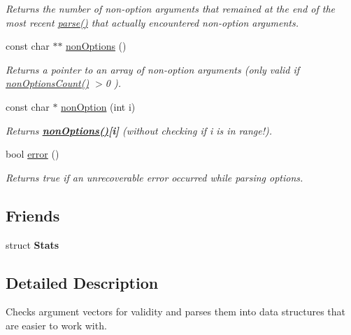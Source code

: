 \begin{DoxyCompactItemize}
\begin{DoxyCompactList}\small\item\em Returns the number of non-\/option arguments that remained at the end of the most recent \hyperlink{classoption_1_1Parser_a6e0b5778d1cfbd6cd51240e74d01e138}{parse()} that actually encountered non-\/option arguments. \end{DoxyCompactList}\item 
const char $\ast$$\ast$ \hyperlink{classoption_1_1Parser_a2c11b050f4248d71758dda52c5f9154d}{non\+Options} ()
\begin{DoxyCompactList}\small\item\em Returns a pointer to an array of non-\/option arguments (only valid if {\ttfamily \hyperlink{classoption_1_1Parser_aa64a6a7c196993a1b20d48e8ddd12a34}{non\+Options\+Count()} $>$0 }). \end{DoxyCompactList}\item 
\mbox{\label{classoption_1_1Parser_aeeafbf2892a5aca90b89803b2b1cb031}} 
const char $\ast$ \hyperlink{classoption_1_1Parser_aeeafbf2892a5aca90b89803b2b1cb031}{non\+Option} (int i)
\begin{DoxyCompactList}\small\item\em Returns {\bfseries {\ttfamily \hyperlink{classoption_1_1Parser_a2c11b050f4248d71758dda52c5f9154d}{non\+Options()}\mbox{[}i\mbox{]}}} ({\itshape without} checking if i is in range!). \end{DoxyCompactList}\item 
bool \hyperlink{classoption_1_1Parser_a2caa149140067b4d13e4d7a104bb3090}{error} ()
\begin{DoxyCompactList}\small\item\em Returns {\ttfamily true} if an unrecoverable error occurred while parsing options. \end{DoxyCompactList}\end{DoxyCompactItemize}
\subsection*{Friends}
\begin{DoxyCompactItemize}
\item 
\mbox{\label{classoption_1_1Parser_a7183dc3501d1c87153f9c0d41f869460}} 
struct {\bfseries Stats}
\end{DoxyCompactItemize}


\subsection{Detailed Description}
Checks argument vectors for validity and parses them into data structures that are easier to work with. 

